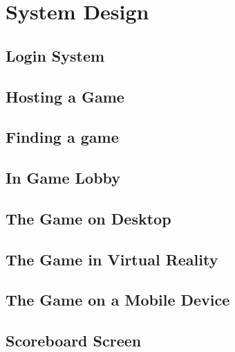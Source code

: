 
\chapter{System Design}

\section{Login System}

\section{Hosting a Game}

\section{Finding a game}

\section{In Game Lobby}

\section{The Game on Desktop}

\section{The Game in Virtual Reality}

\section{The Game on a Mobile Device}

\section{Scoreboard Screen}